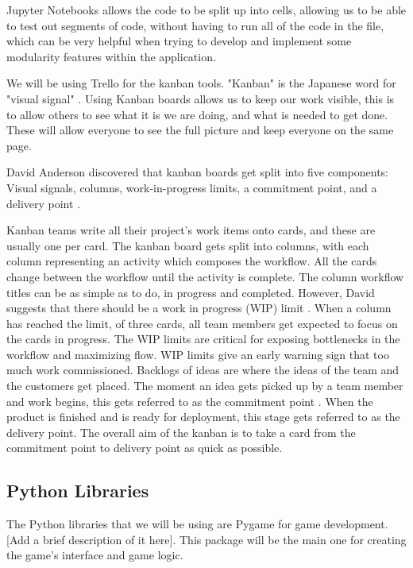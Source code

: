 \documentclass[a4paper,10pt]{article}
\begin{document}
Jupyter Notebooks allows the code to be split up into cells, allowing us to be able to test out segments of code, without having to run all of the code in the file, which can be very helpful when trying to develop and implement some modularity features within the application.

We will be using Trello for the kanban tools. "Kanban" is the Japanese word for "visual signal" \cite{kanbanmeaning}. Using Kanban boards allows us to keep our work visible, this is to allow others to see what it is we are doing, and what is needed to get done. These will allow everyone to see the full picture and keep everyone on the same page.

David Anderson discovered that kanban boards get split into five components: Visual signals, columns, work-in-progress limits, a commitment point, and a delivery point \cite{anderson2010kanban}.

Kanban teams write all their project's work items onto cards, and these are usually one per card. The kanban board gets split into columns, with each column representing an activity which composes the workflow. All the cards change between the workflow until the activity is complete. The column workflow titles can be as simple as to do, in progress and completed. However, David suggests that there should be a work in progress (WIP) limit \cite{anderson2010kanban}. When a column has reached the limit, of three cards, all team members get expected to focus on the cards in progress. The WIP limits are critical for exposing bottlenecks in the workflow and maximizing flow. WIP limits give an early warning sign that too much work commissioned. Backlogs of ideas are where the ideas of the team and the customers get placed. The moment an idea gets picked up by a team member and work begins, this gets referred to as the commitment point \cite{anderson2010kanban}. When the product is finished and is ready for deployment, this stage gets referred to as the delivery point. The overall aim of the kanban is to take a card from the commitment point to delivery point as quick as possible.  

\subsection{Python Libraries} %
The Python libraries that we will be using are Pygame for game development. [Add a brief description of it here]. This package will be the main one for creating the game's interface and game logic. 
\end{document}
